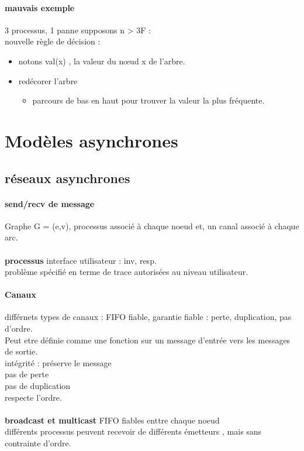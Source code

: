 \documentclass{article}
\begin{document}
\paragraph{mauvais exemple} 3 processus, 1 panne
supposons n > 3F : \\nouvelle règle de décision : 
\begin{itemize}
\item notons val(x) , la valeur du nœud x de l'arbre.
\item redécorer l'arbre 
\begin{itemize}
\item parcours de bas en haut pour trouver la valeur la plus fréquente.
\end{itemize}
\end{itemize}
\newpage
\date{18 Février 2013}
\section{Modèles asynchrones}
\subsection{réseaux asynchrones}
\paragraph{send/recv de  message}
Graphe G = (e,v), processus associé à chaque noeud et, un canal associé à chaque arc.\\\\\textbf{processus} interface utilisateur : inv, resp.\\problème spécifié en terme de trace autorisées au niveau utilisateur.
\paragraph{Canaux} différnets types de canaux : FIFO fiable, garantie fiable : perte, duplication, pas d'ordre.\\Peut etre définie comme une fonction sur un message d'entrée vers les messages de sortie. \\intégrité : préserve le message\\pas de perte\\pas de duplication\\respecte l'ordre.\\\\\textbf{broadcast et multicast} FIFO fiables enttre chaque noeud\\différents processus peuvent recevoir de différents émetteurs , mais sans contrainte d'ordre.
\end{document}
